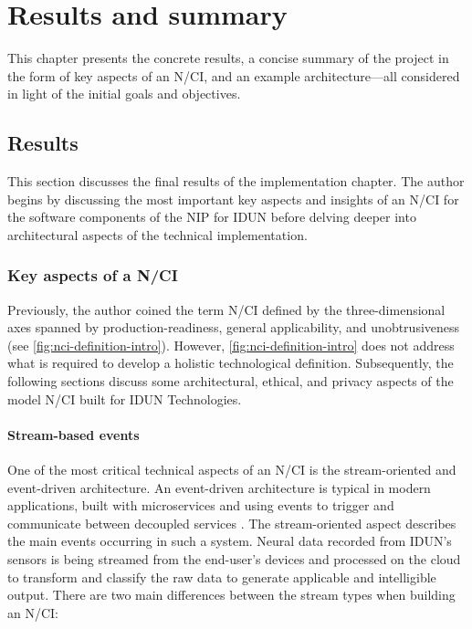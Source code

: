 \chapter{Results and summary}
\graphicspath{{Chapter5/Figs/}{Chapter5/Figs/}}

This chapter presents the concrete results, a concise summary of the project in the form of key aspects of an N/CI, and an example architecture—all considered in light of the initial goals and objectives.

\section{Results}
\label{chapter5-results}

This section discusses the final results of the implementation chapter. The author begins by discussing the most important key aspects and insights of an N/CI for the software components of the NIP for IDUN before delving deeper into architectural aspects of the technical implementation.

\subsection{Key aspects of a N/CI}
\label{chapter5-key-aspects}

Previously, the author coined the term N/CI defined by the three-dimensional axes spanned by production-readiness, general applicability, and unobtrusiveness (see \autoref{fig:nci-definition-intro}). However, \autoref{fig:nci-definition-intro} does not address what is required to develop a holistic technological definition. Subsequently, the following sections discuss some architectural, ethical, and privacy aspects of the model N/CI built for IDUN Technologies.

\subsubsection{Stream-based events}
\label{chapter5-stream-based-events}

One of the most critical technical aspects of an N/CI is the stream-oriented and event-driven architecture. An event-driven architecture is typical in modern applications, built with microservices and using events to trigger and communicate between decoupled services \citep{amazon_web_services_inc_event-driven_nodate}. The stream-oriented aspect describes the main events occurring in such a system. Neural data recorded from IDUN’s sensors is being streamed from the end-user’s devices and processed on the cloud to transform and classify the raw data to generate applicable and intelligible output. There are two main differences between the stream types when building an N/CI:

